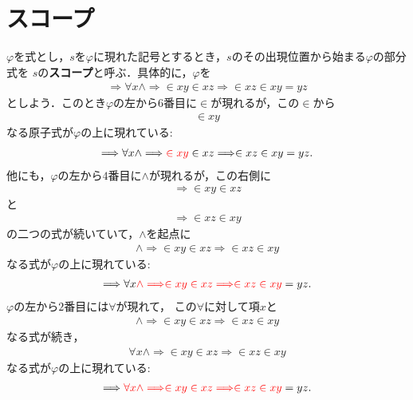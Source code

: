 \section{スコープ}
	$\varphi$を式とし，$s$を$\varphi$に現れた記号とするとき，$s$のその出現位置から始まる$\varphi$の部分式を
	$s$の{\bf スコープ}と呼ぶ．具体的に，$\varphi$を
	\begin{align}
		\Longrightarrow \forall x \wedge \Longrightarrow \in xy \in xz \Longrightarrow \in xz \in xy = yz
	\end{align}
	としよう．このとき$\varphi$の左から$6$番目に$\in$が現れるが，この$\in$から
	\begin{align}
		\in xy
	\end{align}
	なる原子式が$\varphi$の上に現れている:
	\begin{align}
		\Longrightarrow \forall x \wedge \Longrightarrow \textcolor{red}{\in xy} \in xz \Longrightarrow \in xz \in xy = yz.
	\end{align}
	他にも，$\varphi$の左から$4$番目に$\wedge$が現れるが，この右側に
	\begin{align}
		\Longrightarrow \in xy \in xz
	\end{align}
	と
	\begin{align}
		\Longrightarrow \in xz \in xy
	\end{align}
	の二つの式が続いていて，$\wedge$を起点に
	\begin{align}
		\wedge \Longrightarrow \in xy \in xz \Longrightarrow \in xz \in xy
	\end{align}
	なる式が$\varphi$の上に現れている:
	\begin{align}
		\Longrightarrow \forall x \textcolor{red}{\wedge \Longrightarrow \in xy \in xz \Longrightarrow \in xz \in xy} = yz.
	\end{align}
	$\varphi$の左から$2$番目には$\forall$が現れて，
	この$\forall$に対して項$x$と
	\begin{align}
		\wedge \Longrightarrow \in xy \in xz \Longrightarrow \in xz \in xy
	\end{align}
	なる式が続き，
	\begin{align}
		\forall x \wedge \Longrightarrow \in xy \in xz \Longrightarrow \in xz \in xy
	\end{align}
	なる式が$\varphi$の上に現れている:
	\begin{align}
		\Longrightarrow \textcolor{red}{\forall x \wedge \Longrightarrow \in xy \in xz \Longrightarrow \in xz \in xy} = yz.
	\end{align}
	
